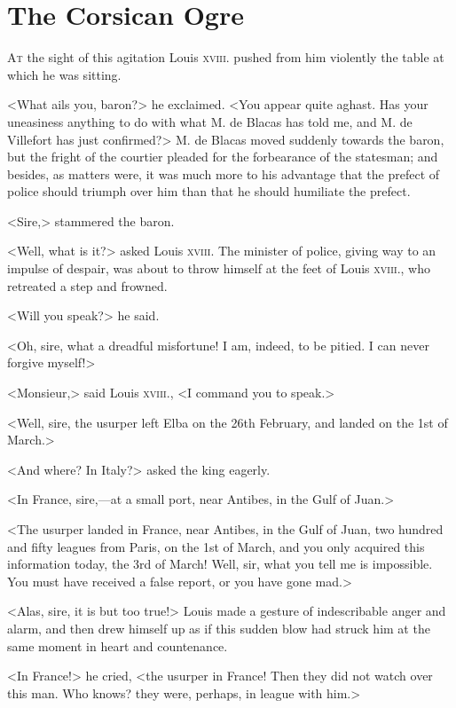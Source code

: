 \chapter{The Corsican Ogre} 

 \lettrine{A}{t} the sight of this agitation Louis \textsc{xviii.} pushed from him violently the table at which he was sitting. 

\zz
 <What ails you, baron?> he exclaimed. <You appear quite aghast. Has your uneasiness anything to do with what M. de Blacas has told me, and M. de Villefort has just confirmed?> M. de Blacas moved suddenly towards the baron, but the fright of the courtier pleaded for the forbearance of the statesman; and besides, as matters were, it was much more to his advantage that the prefect of police should triumph over him than that he should humiliate the prefect. 

 <Sire,\longdash> stammered the baron. 

 <Well, what is it?> asked Louis \textsc{xviii.} The minister of police, giving way to an impulse of despair, was about to throw himself at the feet of Louis \textsc{xviii.}, who retreated a step and frowned. 

 <Will you speak?> he said. 

 <Oh, sire, what a dreadful misfortune! I am, indeed, to be pitied. I can never forgive myself!> 

 <Monsieur,> said Louis \textsc{xviii.}, <I command you to speak.> 

 <Well, sire, the usurper left Elba on the 26th February, and landed on the 1st of March.> 

 <And where? In Italy?> asked the king eagerly. 

 <In France, sire,—at a small port, near Antibes, in the Gulf of Juan.> 

 <The usurper landed in France, near Antibes, in the Gulf of Juan, two hundred and fifty leagues from Paris, on the 1st of March, and you only acquired this information today, the 3rd of March! Well, sir, what you tell me is impossible. You must have received a false report, or you have gone mad.> 

 <Alas, sire, it is but too true!> Louis made a gesture of indescribable anger and alarm, and then drew himself up as if this sudden blow had struck him at the same moment in heart and countenance. 

 <In France!> he cried, <the usurper in France! Then they did not watch over this man. Who knows? they were, perhaps, in league with him.> 

